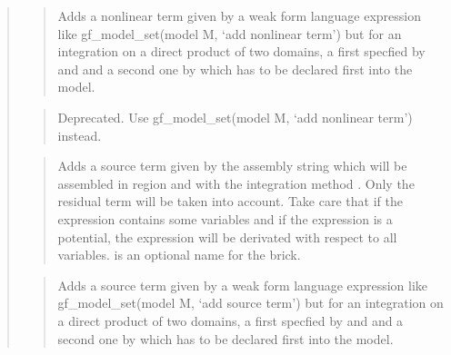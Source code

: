 \documentclass[a4paper,11pt,english]{sphinxmanual}
\begin{document}
\begin{quote}
\begin{quote}
\sphinxAtStartPar
Adds a nonlinear term given by a weak form language expression like
gf\_model\_set(model M, ‘add nonlinear term’) but for an integration on a direct
product of two domains, a first specfied by  and 
and a second one by  which has to be declared
first into the model.
\end{quote}

\sphinxAtStartPar
{}
\begin{quote}

\sphinxAtStartPar
Deprecated. Use gf\_model\_set(model M, ‘add nonlinear term’) instead.
\end{quote}

\sphinxAtStartPar
{}
\begin{quote}

\sphinxAtStartPar
Adds a source term given by the assembly string  which will
be assembled in region  and with the integration method .
Only the residual term will be taken into account.
Take care that if the expression contains some variables and if the
expression is a potential, the expression will be
derivated with respect to all variables.
 is an optional name for the brick.
\end{quote}

\sphinxAtStartPar
{}
\begin{quote}

\sphinxAtStartPar
Adds a source term given by a weak form language expression like
gf\_model\_set(model M, ‘add source term’) but for an integration on a direct
product of two domains, a first specfied by  and 
and a second one by  which has to be declared
first into the model.
\end{quote}


\end{quote}
\end{document}
